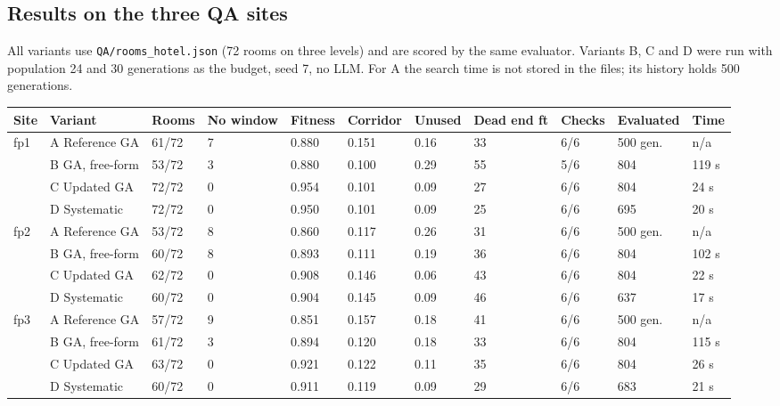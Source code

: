 \documentclass[10pt]{article}
\begin{document}
\subsection{Results on the three QA sites}\label{sec:optqa}
All variants use \texttt{QA/rooms\_hotel.json} (72 rooms on three levels) and are scored by the same evaluator. Variants
B, C and D were run with population 24 and 30 generations as the budget, seed 7, no LLM.
For A the search time is not stored in the files; its history holds 500 generations.
\begingroup{}\label{tab:optcompare}\endgroup
{\small\begin{longtable}{p{0.8cm}p{2.9cm}p{1.1cm}p{1.2cm}p{1.1cm}p{1.2cm}p{1.1cm}p{1.3cm}p{1.0cm}p{1.5cm}p{1.0cm}}
\toprule
\textbf{Site} & \textbf{Variant} & \textbf{Rooms} & \textbf{No window} & \textbf{Fitness} & \textbf{Corridor} & \textbf{Unused} & \textbf{Dead end ft} & \textbf{Checks} & \textbf{Evaluated} & \textbf{Time} \\ \midrule \endhead
fp1 & A Reference GA & 61/72 & 7 & 0.880 & 0.151 & 0.16 & 33 & 6/6 & 500 gen. & n/a \\
 & B GA, free-form & 53/72 & 3 & 0.880 & 0.100 & 0.29 & 55 & 5/6 & 804 & 119 s \\
 & C Updated GA & 72/72 & 0 & 0.954 & 0.101 & 0.09 & 27 & 6/6 & 804 & 24 s \\
 & D Systematic & 72/72 & 0 & 0.950 & 0.101 & 0.09 & 25 & 6/6 & 695 & 20 s \\ \midrule
fp2 & A Reference GA & 53/72 & 8 & 0.860 & 0.117 & 0.26 & 31 & 6/6 & 500 gen. & n/a \\
 & B GA, free-form & 60/72 & 8 & 0.893 & 0.111 & 0.19 & 36 & 6/6 & 804 & 102 s \\
 & C Updated GA & 62/72 & 0 & 0.908 & 0.146 & 0.06 & 43 & 6/6 & 804 & 22 s \\
 & D Systematic & 60/72 & 0 & 0.904 & 0.145 & 0.09 & 46 & 6/6 & 637 & 17 s \\ \midrule
fp3 & A Reference GA & 57/72 & 9 & 0.851 & 0.157 & 0.18 & 41 & 6/6 & 500 gen. & n/a \\
 & B GA, free-form & 61/72 & 3 & 0.894 & 0.120 & 0.18 & 33 & 6/6 & 804 & 115 s \\
 & C Updated GA & 63/72 & 0 & 0.921 & 0.122 & 0.11 & 35 & 6/6 & 804 & 26 s \\
 & D Systematic & 60/72 & 0 & 0.911 & 0.119 & 0.09 & 29 & 6/6 & 683 & 21 s \\
\bottomrule
\end{longtable}}
\end{document}
